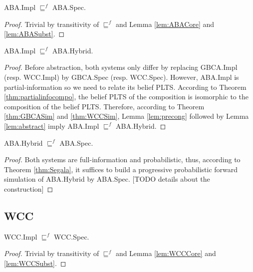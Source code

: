 \begin{theorem}\label{thm:ABASim}
    \textsf{ABA.Impl} $\sqsubseteq^f$ \textsf{ABA.Spec}.
\end{theorem}
\begin{proof}
    Trivial by transitivity of $\sqsubseteq^f$ and Lemma \ref{lem:ABACore} and \ref{lem:ABASubst}.
\end{proof}

\begin{lemma}\label{lem:ABASubst}
    \textsf{ABA.Impl} $\sqsubseteq^f$ \textsf{ABA.Hybrid}.
\end{lemma}
\begin{proof}
    Before abstraction, both systems only differ by replacing \textsf{GBCA.Impl} (resp.
    \textsf{WCC.Impl}) by \textsf{GBCA.Spec} (resp. \textsf{WCC.Spec}). However,
    \textsf{ABA.Impl} is partial-information so we need to relate its belief PLTS.
    According to Theorem \ref{thm:partialinfocompo}, the belief PLTS of the composition
    is isomorphic to the composition of the belief PLTS.
    Therefore, according to Theorem \ref{thm:GBCASim} and \ref{thm:WCCSim},
    Lemma \ref{lem:precong} followed by Lemma \ref{lem:abstract} imply \textsf{ABA.Impl}
    $\sqsubseteq^f$ \textsf{ABA.Hybrid}.
\end{proof}

\begin{lemma}\label{lem:ABACore}
    \textsf{ABA.Hybrid} $\sqsubseteq^f$ \textsf{ABA.Spec}.
\end{lemma}
\begin{proof}
    Both systems are full-information and probabilistic, thus, according to
    Theorem \ref{thm:Segala}, it suffices to build a progressive probabilistic
    forward simulation of \textsf{ABA.Hybrid} by \textsf{ABA.Spec}.
    [TODO details about the construction]
\end{proof}

\subsection{WCC}

\begin{theorem}\label{thm:WCCSim}
    \textsf{WCC.Impl} $\sqsubseteq^f$ \textsf{WCC.Spec}.
\end{theorem}
\begin{proof}
    Trivial by transitivity of $\sqsubseteq^f$ and Lemma \ref{lem:WCCCore} and \ref{lem:WCCSubst}.
\end{proof}

